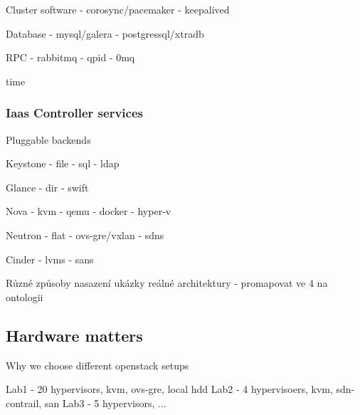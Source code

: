 Cluster software
- corosync/pacemaker
- keepalived

Database
- mysql/galera
- postgressql/xtradb

RPC
- rabbitmq
- qpid
- 0mq

time

\subsubsection{Iaas Controller services}

Pluggable backends

Keystone
- file
- sql
- ldap

Glance
- dir
- swift

Nova
- kvm
- qemu
- docker
- hyper-v

Neutron
- flat
- ovs-gre/vxlan
- sdns

Cinder
- lvms
- sans


Různé způsoby nasazení ukázky reálné architektury - promapovat ve 4 na ontologii

\subsection{Hardware matters}

Why we choose different openstack setups

Lab1 - 20 hypervisors, kvm, ovs-gre, local hdd
Lab2 - 4 hypervisoers, kvm, sdn-contrail, san
Lab3 - 5 hypervisors, ...


